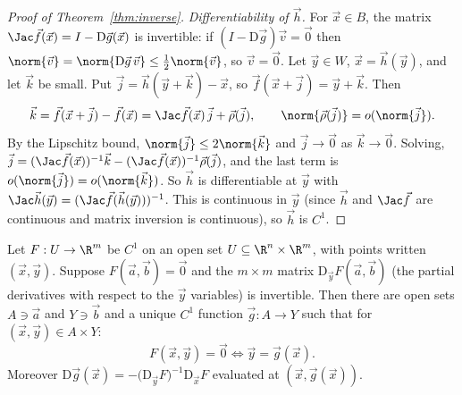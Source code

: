 \begin{proof}[Proof of Theorem~\ref{thm:inverse}]
\emph{Differentiability of $\vec h$.} For $\vec x\in B$, the matrix $\Jac\vec f(\vec x)=I-\mathrm{D}\vec g(\vec x)$ is invertible: if $(I-\mathrm{D}\vec g)\vec v=\vec 0$ then $\norm{\vec v}=\norm{\mathrm{D}\vec g\,\vec v}\le\tfrac12\norm{\vec v}$, so $\vec v=\vec 0$. Let $\vec y\in W$, $\vec x=\vec h(\vec y)$, and let $\vec k$ be small. Put $\vec j=\vec h(\vec y+\vec k)-\vec x$, so $\vec f(\vec x+\vec j)=\vec y+\vec k$. Then
\[
\vec k=\vec f(\vec x+\vec j)-\vec f(\vec x)=\Jac\vec f(\vec x)\,\vec j+\vec\rho(\vec j),\qquad\norm{\vec\rho(\vec j)}=o(\norm{\vec j}).
\]
By the Lipschitz bound, $\norm{\vec j}\le2\norm{\vec k}$ and $\vec j\to\vec0$ as $\vec k\to\vec0$. Solving, $\vec j=(\Jac\vec f(\vec x))^{-1}\vec k-(\Jac\vec f(\vec x))^{-1}\vec\rho(\vec j)$, and the last term is $o(\norm{\vec j})=o(\norm{\vec k})$. So $\vec h$ is differentiable at $\vec y$ with $\Jac\vec h(\vec y)=(\Jac\vec f(\vec h(\vec y)))^{-1}$. This is continuous in $\vec y$ (since $\vec h$ and $\Jac\vec f$ are continuous and matrix inversion is continuous), so $\vec h$ is $C^1$.
\end{proof}

\begin{theorem}\label{thm:implicit}
Let $F:U\to\R^m$ be $C^1$ on an open set $U\subseteq\R^n\times\R^m$, with points written $(\vec x,\vec y)$. Suppose $F(\vec a,\vec b)=\vec 0$ and the $m\times m$ matrix $\mathrm{D}_{\vec y}F(\vec a,\vec b)$ (the partial derivatives with respect to the $\vec y$ variables) is invertible. Then there are open sets $A\ni\vec a$ and $Y\ni\vec b$ and a unique $C^1$ function $\vec g:A\to Y$ such that for $(\vec x,\vec y)\in A\times Y$:
\[
F(\vec x,\vec y)=\vec 0\iff\vec y=\vec g(\vec x).
\]
Moreover $\mathrm{D}\vec g(\vec x)=-\bigl(\mathrm{D}_{\vec y}F\bigr)^{-1}\mathrm{D}_{\vec x}F$ evaluated at $(\vec x,\vec g(\vec x))$.
\end{theorem}

